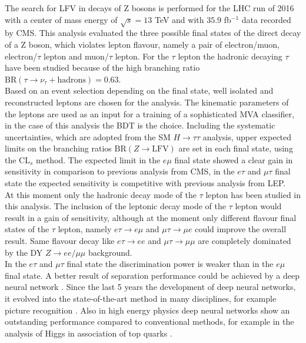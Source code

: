 The search for \gls{LFV} in decays of Z bosons is performed for the \gls{LHC} run of 2016 with a center of mass energy of $\sqrt{s} = 13$ TeV and with $35.9$ fb$^{-1}$ data recorded by \gls{CMS}. This analysis evaluated the three possible final states of the direct decay of a Z boson, which violates lepton flavour, namely a pair of electron/muon, electron/$\tau$ lepton and muon/$\tau$ lepton. For the $\tau$ lepton the hadronic decaying $\tau$ have been studied because of the high branching ratio $\text{BR}(\tau \to \nu_{\tau} + \text{hadrons}) = 0.63$. \\

Based on an event selection depending on the final state, well isolated and reconstructed leptons are chosen for the analysis. The kinematic parameters of the leptons are used as an input for a training of a sophisticated \gls{MVA} classifier, in the case of this analysis the \gls{BDT} is the choice. Including the systematic uncertainties, which are adopted from the \gls{SM} $H \to \tau\tau$ analysis, upper expected limits on the branching ratios $\text{BR}(Z \to \text{LFV})$ are set in each final state, using the $\text{CL}_{s}$ method. The expected limit in the $e\mu$ final state showed a clear gain in sensitivity in comparison to previous analysis from \gls{CMS}, in the $e\tau$ and $\mu\tau$ final state the expected sensitivity is competitive with previous analysis from \gls{LEP}. \\

At this moment only the hadronic decay mode of the $\tau$ lepton has been studied in this analysis. The inclusion of the leptonic decay mode of the $\tau$ lepton would result in a gain of sensitivity, although at the moment only different flavour final states of the $\tau$ lepton, namely $e\tau \to e\mu$ and $\mu\tau \to \mu e$ could improve the overall result. Same flavour decay like $e\tau \to ee$ and $\mu\tau \to \mu\mu$ are completely dominated by the \gls{DY} $Z\to ee/\mu\mu$ background. \\

In the $e\tau$ and $\mu\tau$ final state the discrimination power is weaker than in the $e\mu$ final state. A better result of separation performance could be achieved by a deep neural network \cite{DNN}. Since the last 5 years the development of deep neural networks, it evolved into the state-of-the-art method in many disciplines, for example picture recognition \cite{DNN2}. Also in high energy physics deep neural networks show an outstanding performance compared to conventional methods, for example in the analysis of Higgs in association of top quarks \cite{DNN3}. \\

